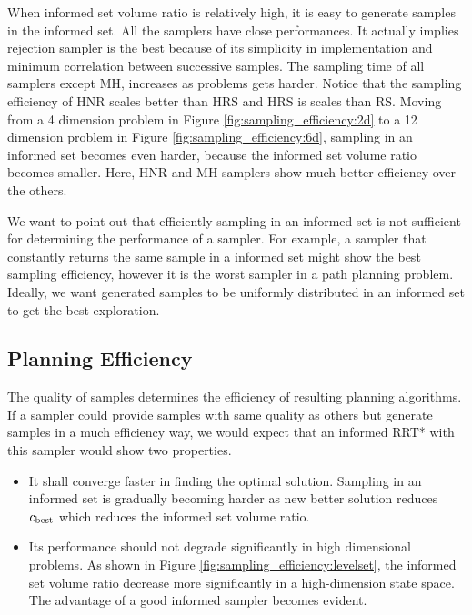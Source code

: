 \documentclass[letterpaper, 10 pt, conference]{ieeeconf}  %
\begin{document}
When informed set volume ratio is relatively high, it is easy to generate samples in the informed set.
All the samplers have close performances.
It actually implies rejection sampler is the best because of its simplicity in implementation and minimum correlation between successive samples.
The sampling time of all samplers except MH, increases as problems gets harder.
Notice that the sampling efficiency of HNR scales better than HRS and HRS is scales than RS.
Moving from a 4 dimension problem in Figure \ref{fig:sampling_efficiency:2d} to a 12 dimension problem in Figure \ref{fig:sampling_efficiency:6d}, sampling in an informed set becomes even harder, because the informed set volume ratio becomes smaller.
Here, HNR and MH samplers show much better efficiency over the others.

We want to point out that efficiently sampling in an informed set is not sufficient for determining the performance of a sampler.
For example, a sampler that constantly returns the same sample in a informed set might show the best sampling efficiency, however it is the worst sampler in a path planning problem.
Ideally, we want generated samples to be uniformly distributed in an informed set to get the best exploration.

\subsection{Planning Efficiency}

The quality of samples determines the efficiency of resulting planning algorithms.
If a sampler could provide samples with same quality as others but generate samples in a much efficiency way, we would expect that an informed RRT* with this sampler would show two properties.
\begin{itemize}
	\item It shall converge faster in finding the optimal solution.
	Sampling in an informed set is gradually becoming harder as new better solution reduces $ c_{\rm best} $ which reduces the informed set volume ratio.
	\item Its performance should not degrade significantly in high dimensional problems.
	As shown in Figure \ref{fig:sampling_efficiency:levelset}, the informed set volume ratio decrease more significantly in a high-dimension state space.
	The advantage of a good informed sampler becomes evident.
\end{itemize}
\end{document}
